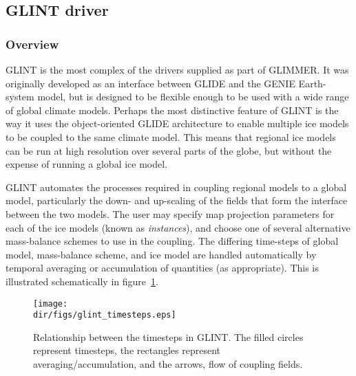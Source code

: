 \newpage
\subsection{GLINT driver}
\subsubsection{Overview}
%
GLINT is the most complex of the drivers supplied as part of GLIMMER. It was
originally developed as an interface between GLIDE and the GENIE Earth-system
model, but is designed to be flexible enough to be used with a wide range of
global climate models. Perhaps the most distinctive feature of GLINT is the
way it uses the object-oriented GLIDE architecture to enable multiple ice
models to be coupled to the same climate model. This means that regional ice
models can be run at high resolution over several parts of the globe, but
without the expense of running a global ice model.

GLINT automates the processes required in coupling regional models to a global
model, particularly the down- and up-scaling of the fields that form the
interface between the two models. The user may specify map projection
parameters for each of the ice models (known as \emph{instances}), and choose
one of several alternative mass-balance schemes to use in the coupling. The
differing time-steps of global model, mass-balance scheme, and ice model are
handled automatically by temporal averaging or accumulation of quantities (as
appropriate). This is illustrated schematically in figure~\ref{ug.fig.glint_timesteps}.  
%
\begin{figure}[htbp]
  \centering
  \texttt{[image: \\dir/figs/glint\_timesteps.eps]}
  \caption{Relationship between the timesteps in GLINT. The filled circles
  represent timesteps, the rectangles represent averaging/accumulation, and the arrows,
  flow of coupling fields.}
  \label{ug.fig.glint_timesteps}
\end{figure}
%
